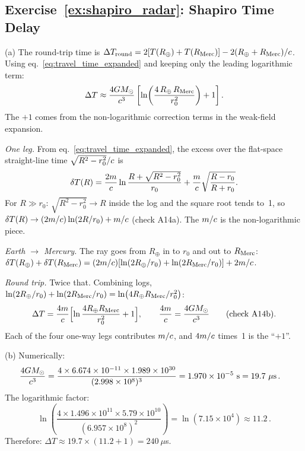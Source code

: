 \subsection*{Exercise~\ref{ex:shapiro_radar}: Shapiro Time Delay}

(a) The round-trip time is $\Delta T_{\mathrm{round}} =
2[T(R_\oplus) + T(R_{\mathrm{Merc}})] - 2(R_\oplus + R_{\mathrm{Merc}})/
c$.  Using eq.~\eqref{eq:travel_time_expanded} and keeping only the leading logarithmic
term:
\begin{equation*}
    \Delta T \approx \frac{4G M_{\odot}}{c^3}
    \left[\ln\!\left(\frac{4\, R_\oplus\, R_{\mathrm{Merc}}}{r_0^2}\right)
    + 1\right] .
\end{equation*}
The $+1$ comes from the non-logarithmic correction terms in the
weak-field expansion.


\begin{derivation}
\textit{One leg.}  From eq.~\eqref{eq:travel_time_expanded}, the excess over the
flat-space straight-line time $\sqrt{R^2-r_0^2}/c$ is
\[
    \delta T(R) = \frac{2m}{c}\ln\frac{R + \sqrt{R^2-r_0^2}}{r_0}
    + \frac{m}{c}\sqrt{\frac{R-r_0}{R+r_0}} .
\]
For $R \gg r_0$: $\sqrt{R^2-r_0^2} \to R$ inside the log and the square root
tends to~1, so $\delta T(R) \to (2m/c)\ln(2R/r_0) + m/c$
(check A14a).  The $m/c$ is the non-logarithmic piece.

\textit{Earth $\to$ Mercury.}  The ray goes from $R_\oplus$ in to $r_0$ and out
to $R_{\rm Merc}$: $\delta T(R_\oplus) + \delta T(R_{\rm Merc})
= (2m/c)[\ln(2R_\oplus/r_0) + \ln(2R_{\rm Merc}/r_0)]
+ 2m/c$.

\textit{Round trip.}  Twice that.  Combining logs,
$\ln(2R_\oplus/r_0) + \ln(2R_{\rm Merc}/r_0) = \ln(4R_\oplus R_{\rm Merc}/r_0^2)$:
\[
    \Delta T = \frac{4m}{c}\Bigl[\ln\frac{4R_\oplus R_{\rm Merc}}{r_0^2}
    + 1\Bigr], \qquad \frac{4m}{c} = \frac{4GM_{\odot}}{c^3}
    \qquad(\text{check A14b}).
\]
Each of the four one-way legs contributes $m/c$, and
$4m/c$ times~1 is the ``$+1$''.
\end{derivation}
(b) Numerically:
\begin{align*}
    \frac{4G M_{\odot}}{c^3}
    &= \frac{4 \times 6.674 \times 10^{-11} \times 1.989 \times 10^{30}}
    {(2.998 \times 10^{8})^3}
    = 1.970 \times 10^{-5}~\text{s} = 19.7~\mu\text{s} \,.
\end{align*}
The logarithmic factor:
\begin{equation*}
    \ln\!\left(\frac{4 \times 1.496 \times 10^{11} \times
    5.79 \times 10^{10}}{(6.957 \times 10^{8})^2}\right)
    = \ln(7.15 \times 10^4) \approx 11.2 \,.
\end{equation*}
Therefore:
$\Delta T \approx 19.7 \times (11.2 + 1) = 240~\mu$s.


